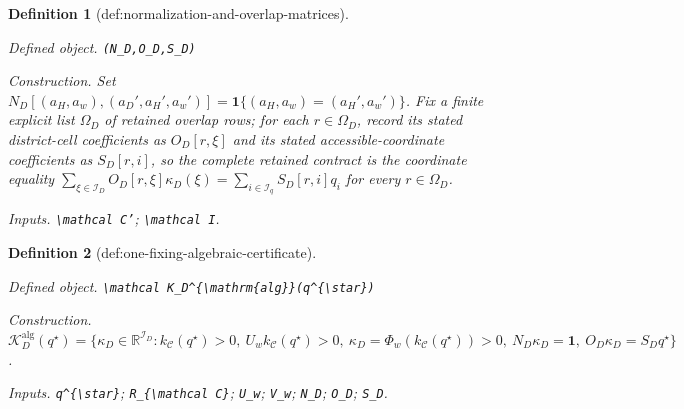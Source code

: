 \documentclass{article}
\newtheorem{definition}{Definition}
\begin{document}
\begin{definition}[def:normalization-and-overlap-matrices]\label{def:normalization-and-overlap-matrices}
\par\smallskip\noindent\emph{Defined object.} \texttt{(N\_\allowbreak{}D,\allowbreak{}O\_\allowbreak{}D,\allowbreak{}S\_\allowbreak{}D)}
\par\smallskip\noindent\emph{Construction.} Set \(N_D[(a_H,a_w),(a_D',a_H',a_w')]=\mathbf 1\{(a_H,a_w)=(a_H',a_w')\}\). Fix a finite explicit list \(\Omega_D\) of retained overlap rows; for each \(r\in\Omega_D\), record its stated district-cell coefficients as \(O_D[r,\xi]\) and its stated accessible-coordinate coefficients as \(S_D[r,i]\), so the complete retained contract is the coordinate equality \(\sum_{\xi\in\mathcal I_D}O_D[r,\xi]\kappa_D(\xi)=\sum_{i\in\mathcal I_q}S_D[r,i]q_i\) for every \(r\in\Omega_D\).
\par\smallskip\noindent\emph{Inputs.} \texttt{\textbackslash{}\allowbreak{}mathcal C'}; \texttt{\textbackslash{}\allowbreak{}mathcal I}.
\end{definition}

\begin{definition}[def:one-fixing-algebraic-certificate]\label{def:one-fixing-algebraic-certificate}
\par\smallskip\noindent\emph{Defined object.} \texttt{\textbackslash{}\allowbreak{}mathcal K\_\allowbreak{}D\textasciicircum{}\{\textbackslash{}\allowbreak{}mathrm\{alg\}\allowbreak{}\}\allowbreak{}(q\textasciicircum{}\{\textbackslash{}\allowbreak{}star\}\allowbreak{})}
\par\smallskip\noindent\emph{Construction.} \(\mathcal K_D^{\mathrm{alg}}(q^{\star})=\{\kappa_D\in\mathbb R^{\mathcal I_D}:k_{\mathcal C}(q^{\star})>0,\ U_wk_{\mathcal C}(q^{\star})>0,\ \kappa_D=\Phi_w(k_{\mathcal C}(q^{\star}))>0,\ N_D\kappa_D=\mathbf 1,\ O_D\kappa_D=S_Dq^{\star}\}\).
\par\smallskip\noindent\emph{Inputs.} \texttt{q\textasciicircum{}\{\textbackslash{}\allowbreak{}star\}\allowbreak{}}; \texttt{R\_\allowbreak{}\{\textbackslash{}\allowbreak{}mathcal C\}\allowbreak{}}; \texttt{U\_\allowbreak{}w}; \texttt{V\_\allowbreak{}w}; \texttt{N\_\allowbreak{}D}; \texttt{O\_\allowbreak{}D}; \texttt{S\_\allowbreak{}D}.
\end{definition}
\end{document}
